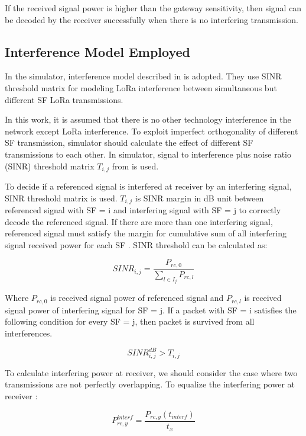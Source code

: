 \documentclass[conference]{IEEEtran}
\begin{document}
If the received signal power is higher than the gateway sensitivity, then signal can be decoded by the receiver successfully when there is no interfering transmission.

\subsection{Interference Model Employed}
In the simulator, interference model described in \cite{7996384} is adopted. They use SINR threshold matrix for modeling LoRa interference between simultaneous but different SF LoRa transmissions.

In this work, it is assumed that there is no other technology interference in the network except LoRa interference. To exploit imperfect orthogonality of different SF transmission, simulator should calculate the effect of different SF transmissions to each other. In simulator, signal to interference plus noise ratio (SINR) threshold matrix $T_{i,j}$ from \cite{goursaud:hal-01231221} is used.

To decide if a referenced signal is interfered at receiver by an interfering signal, SINR threshold matrix is used. $T_{i,j}$ is SINR margin in dB unit between referenced signal with SF = i and interfering signal with SF = j to correctly decode the referenced signal. If there are more than one interfering signal, referenced signal must satisfy the margin for cumulative sum of all interfering signal received power for each SF \cite{7996384}. SINR threshold can be calculated as:

\begin{equation} \label{eq:sinr_db}
SINR_{i,j} = \dfrac{P_{rc,0}}{\sum_{l \in I_j} P_{rc,l}}
\end{equation}

Where $P_{rc,0}$ is received signal power of referenced signal and $P_{rc,l}$ is received signal power of interfering signal for SF = j. If a packet with SF = i satisfies the following condition for every SF = j, then packet is survived from all interferences.

\begin{equation} \label{eq:sinr_t}
SINR_{i,j}^{dB} > T_{i,j}
\end{equation}

To calculate interfering power at receiver, we should consider the case where two transmissions are not perfectly overlapping. To equalize the interfering power at receiver \cite{7996384}:

\begin{equation} \label{eq:p_interference}
P_{rc,y}^{interf} = \dfrac{P_{rc,y}(t_{interf})}{t_{x}}
\end{equation}
\end{document}
